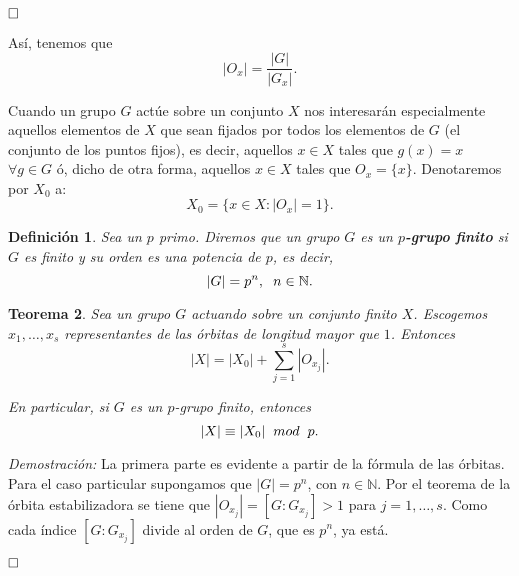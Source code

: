 \documentclass[12pt]{article}
\newtheorem{theorem}{Teorema}[section]
\newtheorem{definition}[theorem]{Definición}
\begin{document}
$\hfill \square$

Así, tenemos que $$|O_{x}| = \dfrac{|G|}{|G_{x}|}.$$

Cuando un grupo $G$ actúe sobre un conjunto $X$ nos interesarán especialmente aquellos elementos de $X$ que sean fijados por todos los elementos de $G$ (el conjunto de los puntos fijos), es decir, aquellos $x \in X$ tales que $g(x) = x$ $\forall g \in G$ ó, dicho de otra forma, aquellos $x \in X$ tales que $O_{x} = \lbrace x \rbrace$. Denotaremos por $X_{0}$ a: $$X_{0} = \lbrace x \in X: |O_{x}| = 1 \rbrace.$$

\begin{definition} Sea un $p$ primo. Diremos que un grupo $G$ es un \textbf{$p$-grupo finito} si $G$ es finito y su orden es una potencia de $p$, es decir, $$|G| = p^{n}, \hspace{0.2cm} n \in \mathbb{N}.$$ 
\end{definition}

\begin{theorem}\label{eq:ecClasesp}
Sea un grupo $G$ actuando sobre un conjunto finito $X$. Escogemos $x_{1}, \ldots, x_{s}$ representantes de las órbitas de longitud mayor que $1$. Entonces $$|X| = |X_{0}| + \sum_{j=1}^{s} |O_{x_{j}}|.$$

En particular, si $G$ es un $p$-grupo finito, entonces $$|X| \equiv |X_{0}| \hspace{0.2cm} mod \hspace{0.2cm} p.$$
\end{theorem}
\emph{Demostración: }La primera parte es evidente a partir de la fórmula de las órbitas. Para el caso particular supongamos que $|G| = p^{n}$, con $n\in \mathbb{N}$. Por el teorema de la órbita estabilizadora se tiene que $|O_{x_{j}}| = [G:G_{x_{j}}]>1$ para $j = 1, \ldots, s$. Como cada índice $[G:G_{x_{j}}]$ divide al orden de $G$, que es $p^{n}$, ya está.

$\hfill \square$
\end{document}
